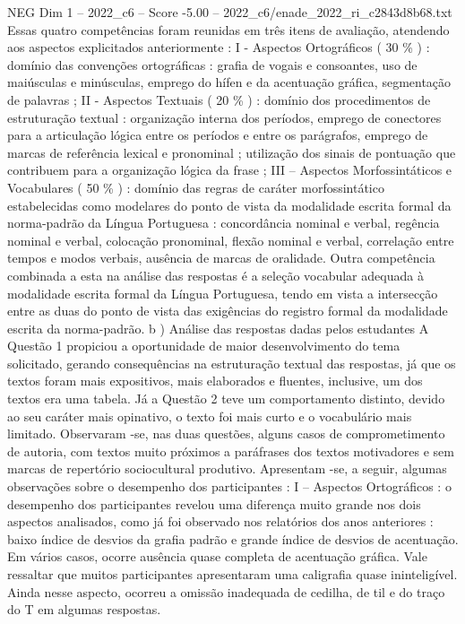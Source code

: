 \begin{textsample}{NEG Dim 1 – 2022\_c6 – Score -5.00 – 2022\_c6/enade\_2022\_ri\_c2843d8b68.txt}
Essas quatro competências foram reunidas em três itens de avaliação, atendendo aos aspectos explicitados anteriormente : I - Aspectos Ortográficos ( 30 \% ) : domínio das convenções ortográficas : grafia de vogais e consoantes, uso de maiúsculas e minúsculas, emprego do hífen e da acentuação gráfica, segmentação de palavras ; II - Aspectos Textuais ( 20 \% ) : domínio dos procedimentos de estruturação textual : organização interna dos períodos, emprego de conectores para a articulação lógica entre os períodos e entre os parágrafos, emprego de marcas de referência lexical e pronominal ; utilização dos sinais de pontuação que contribuem para a organização lógica da frase ; III – Aspectos Morfossintáticos e Vocabulares ( 50 \% ) : domínio das regras de caráter morfossintático estabelecidas como modelares do ponto de vista da modalidade escrita formal da norma-padrão da Língua Portuguesa : concordância nominal e verbal, regência nominal e verbal, colocação pronominal, flexão nominal e verbal, correlação entre tempos e modos verbais, ausência de marcas de oralidade.
Outra competência combinada a esta na análise das respostas é a seleção vocabular adequada à modalidade escrita formal da Língua Portuguesa, tendo em vista a intersecção entre as duas do ponto de vista das exigências do registro formal da modalidade escrita da norma-padrão. b ) Análise das respostas dadas pelos estudantes A Questão 1 propiciou a oportunidade de maior desenvolvimento do tema solicitado, gerando consequências na estruturação textual das respostas, já que os textos foram mais expositivos, mais elaborados e fluentes, inclusive, um dos textos era uma tabela.
Já a Questão 2 teve um comportamento distinto, devido ao seu caráter mais opinativo, o texto foi mais curto e o vocabulário mais limitado.
Observaram -se, nas duas questões, alguns casos de comprometimento de autoria, com textos muito próximos a paráfrases dos textos motivadores e sem marcas de repertório sociocultural produtivo.
Apresentam -se, a seguir, algumas observações sobre o desempenho dos participantes : I – Aspectos Ortográficos : o desempenho dos participantes revelou uma diferença muito grande nos dois aspectos analisados, como já foi observado nos relatórios dos anos anteriores : baixo índice de desvios da grafia padrão e grande índice de desvios de acentuação.
Em vários casos, ocorre ausência quase completa de acentuação gráfica.
Vale ressaltar que muitos participantes apresentaram uma caligrafia quase ininteligível.
Ainda nesse aspecto, ocorreu a omissão inadequada de cedilha, de til e do traço do T em algumas respostas.

\end{textsample}

